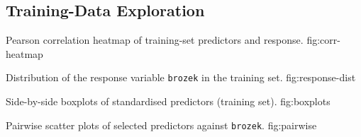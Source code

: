 \subsection{Training-Data Exploration}
\label{sec:eda}

%
    {Pearson correlation heatmap of training-set predictors and response.}%
    {fig:corr-heatmap}


%
    {Distribution of the response variable \texttt{brozek} in the training set.}%
    {fig:response-dist}


%
    {Side-by-side boxplots of standardised predictors (training set).}%
    {fig:boxplots}


%
    {Pairwise scatter plots of selected predictors against \texttt{brozek}.}%
    {fig:pairwise}

